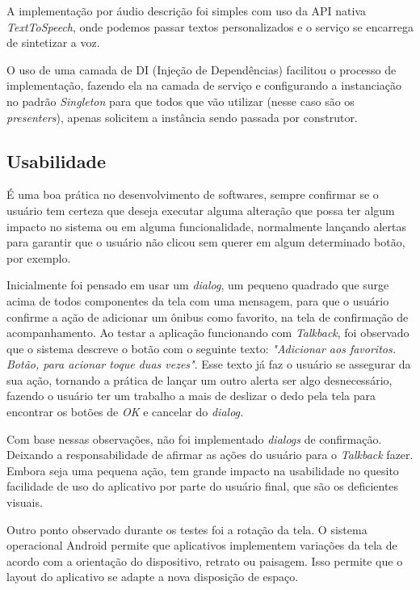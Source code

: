 \documentclass[
	12pt,				%
	oneside,			%
	a4paper,			%
	brazil				%
]{abntex2}
\begin{document}
A implementação por áudio descrição foi simples com uso da API nativa \textit{TextToSpeech}, onde podemos passar textos personalizados e o serviço se encarrega de sintetizar a voz.

O uso de uma camada de DI (Injeção de Dependências) facilitou o processo de implementação, fazendo ela na camada de serviço e configurando a instanciação no padrão \textit{Singleton} para que todos que vão utilizar (nesse caso são os \textit{presenters}), apenas solicitem a instância sendo passada por construtor.

\subsection{Usabilidade}

É uma boa prática no desenvolvimento de softwares, sempre confirmar se o usuário tem certeza que deseja executar alguma alteração que possa ter algum impacto no sistema ou em alguma funcionalidade, normalmente lançando alertas para garantir que o usuário não clicou sem querer em algum determinado botão, por exemplo. 

Inicialmente foi pensado em usar um \textit{dialog}, um pequeno quadrado que surge acima de todos componentes da tela com uma mensagem, para que o usuário confirme a ação de adicionar um ônibus como favorito, na tela de confirmação de acompanhamento. Ao testar a aplicação funcionando com \textit{Talkback}, foi observado que o sistema descreve o botão com o seguinte texto: \textit{"Adicionar aos favoritos. Botão, para acionar toque duas vezes"}. Esse texto já faz o usuário se assegurar da sua ação, tornando a prática de lançar um outro alerta ser algo desnecessário, fazendo o usuário ter um trabalho a mais de deslizar o dedo pela tela para encontrar os botões de \textit{OK} e cancelar do \textit{dialog.}

Com base nessas observações, não foi implementado \textit{dialogs} de confirmação. Deixando a responsabilidade de afirmar as ações do usuário para o \textit{Talkback} fazer. Embora seja uma pequena ação, tem grande impacto na usabilidade no quesito facilidade de uso do aplicativo por parte do usuário final, que são os deficientes visuais.

Outro ponto observado durante os testes foi a rotação da tela. O sistema operacional Android permite que aplicativos implementem variações da tela de acordo com a orientação do dispositivo, retrato ou paisagem. Isso permite que o layout do aplicativo se adapte a nova disposição de espaço.
\end{document}

